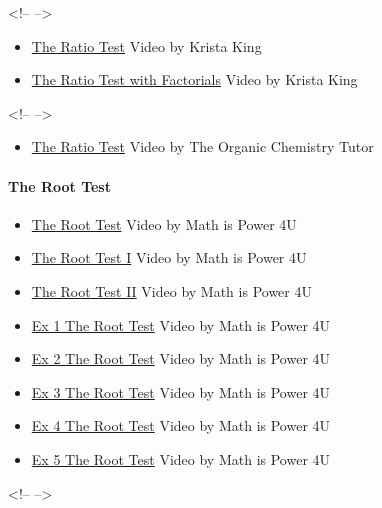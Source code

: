 <!-- -->



\begin{itemize}
    \item \href{https://www.youtube.com/watch?v=WeFse6u19fA}{The Ratio Test} Video by Krista King
    \item \href{https://www.youtube.com/watch?v=uMLBA6CHR1E}{The Ratio Test with Factorials} Video by Krista King
\end{itemize}

<!-- -->



\begin{itemize}
    \item \href{https://www.youtube.com/watch?v=kkfILYpkJS8}{The Ratio Test} Video by The Organic Chemistry Tutor
\end{itemize}

\paragraph{The Root Test}



\begin{itemize}
    \item \href{https://www.youtube.com/watch?v=ZE5Pj7s9PWg}{The Root Test} Video by Math is Power 4U
    \item \href{https://www.youtube.com/watch?v=eHzBsFxBzpA}{The Root Test I} Video by Math is Power 4U
    \item \href{https://www.youtube.com/watch?v=eMMtyG7hIyI}{The Root Test II} Video by Math is Power 4U
    \item \href{https://www.youtube.com/watch?v=yVva1LwaE9c}{Ex 1 The Root Test} Video by Math is Power 4U
    \item \href{https://www.youtube.com/watch?v=oKUfBJF5XTI}{Ex 2 The Root Test} Video by Math is Power 4U
    \item \href{https://www.youtube.com/watch?v=Xxzs4sa_zZg}{Ex 3 The Root Test} Video by Math is Power 4U
    \item \href{https://www.youtube.com/watch?v=5HLqCSEgaFI}{Ex 4 The Root Test} Video by Math is Power 4U
    \item \href{https://www.youtube.com/watch?v=JEDrZfwsW1M}{Ex 5 The Root Test} Video by Math is Power 4U
\end{itemize}

<!-- -->



